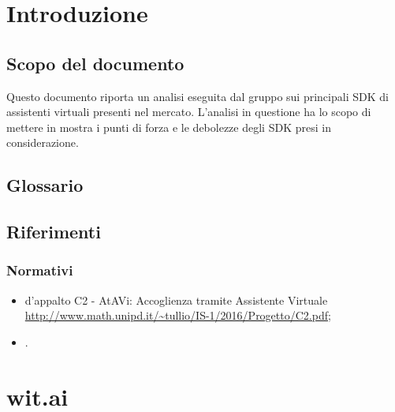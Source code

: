 \documentclass[a4paper,titlepage]{article}
\begin{document}
\maketitle

\newpage
\tableofcontents
\newpage


\section{Introduzione}
	\subsection{Scopo del documento}
Questo documento riporta un analisi eseguita dal gruppo \GRUPPO{} sui principali SDK di assistenti virtuali presenti nel mercato. L'analisi in questione ha lo scopo di mettere in mostra i punti di forza e le debolezze degli SDK presi in considerazione.
	\subsection{Glossario}
	\GLOSSARIO
	\subsection{Riferimenti}
		\subsubsection{Normativi}
\begin{itemize}
\item {} d'appalto C2 - AtAVi: Accoglienza tramite Assistente Virtuale \\	\url{http://www.math.unipd.it/~tullio/IS-1/2016/Progetto/C2.pdf};
\item \NPdoc.
\end{itemize}
\newpage
\section{wit.ai}
\end{document}
